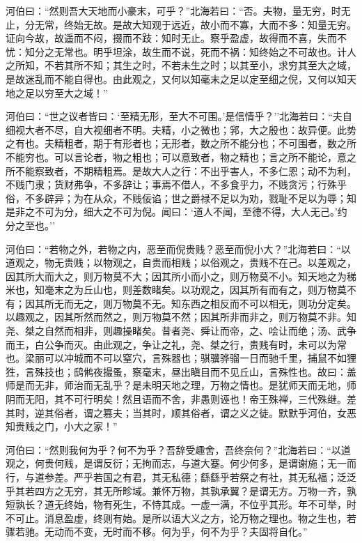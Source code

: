 \documentclass[]{article}
\begin{document}
河伯曰：``然则吾大天地而小豪末，可乎？''北海若曰：``否。夫物，量无穷，时无止，分无常，终始无故。是故大知观于远近，故小而不寡，大而不多：知量无穷。证向今故，故遥而不闷，掇而不跂：知时无止。察乎盈虚，故得而不喜，失而不忧：知分之无常也。明乎坦涂，故生而不说，死而不祸：知终始之不可故也。计人之所知，不若其所不知；其生之时，不若未生之时；以其至小，求穷其至大之域，是故迷乱而不能自得也。由此观之，又何以知毫末之足以定至细之倪，又何以知天地之足以穷至大之域！''

河伯曰：``世之议者皆曰：`至精无形，至大不可围。'是信情乎？''北海若曰：``夫自细视大者不尽，自大视细者不明。夫精，小之微也；郛，大之殷也：故异便。此势之有也。夫精粗者，期于有形者也；无形者，数之所不能分也；不可围者，数之所不能穷也。可以言论者，物之粗也；可以意致者，物之精也；言之所不能论，意之所不能察致者，不期精粗焉。是故大人之行：不出乎害人，不多仁恩；动不为利，不贱门隶；货财弗争，不多辞让；事焉不借人，不多食乎力，不贱贪污；行殊乎俗，不多辟异；为在从众，不贱佞谄；世之爵禄不足以为劝，戮耻不足以为辱；知是非之不可为分，细大之不可为倪。闻曰：`道人不闻，至德不得，大人无己。'约分之至也。''

河伯曰：``若物之外，若物之内，恶至而倪贵贱？恶至而倪小大？''北海若曰：``以道观之，物无贵贱；以物观之，自贵而相贱；以俗观之，贵贱不在己。以差观之，因其所大而大之，则万物莫不大；因其所小而小之，则万物莫不小。知天地之为稊米也，知毫末之为丘山也，则差数睹矣。以功观之，因其所有而有之，则万物莫不有；因其所无而无之，则万物莫不无。知东西之相反而不可以相无，则功分定矣。以趣观之，因其所然而然之，则万物莫不然；因其所非而非之，则万物莫不非。知尧、桀之自然而相非，则趣操睹矣。昔者尧、舜让而帝，之、哙让而绝；汤、武争而王，白公争而灭。由此观之，争让之礼，尧、桀之行，贵贱有时，未可以为常也。梁丽可以冲城而不可以窒穴，言殊器也；骐骥骅骝一日而驰千里，捕鼠不如狸狌，言殊技也；鸱鸺夜撮蚤，察毫末，昼出瞋目而不见丘山，言殊性也。故曰：盖师是而无非，师治而无乱乎？是未明天地之理，万物之情也。是犹师天而无地，师阴而无阳，其不可行明矣！然且语而不舍，非愚则诬也！帝王殊禅，三代殊继。差其时，逆其俗者，谓之篡夫；当其时，顺其俗者，谓之义之徒。默默乎河伯，女恶知贵贱之门，小大之家！''

河伯曰：``然则我何为乎？何不为乎？吾辞受趣舍，吾终奈何？''北海若曰：``以道观之，何贵何贱，是谓反衍；无拘而志，与道大蹇。何少何多，是谓谢施；无一而行，与道参差。严乎若国之有君，其无私德；繇繇乎若祭之有社，其无私福；泛泛乎其若四方之无穷，其无所畛域。兼怀万物，其孰承翼？是谓无方。万物一齐，孰短孰长？道无终始，物有死生，不恃其成。一虚一满，不位乎其形。年不可举，时不可止。消息盈虚，终则有始。是所以语大义之方，论万物之理也。物之生也，若骤若驰。无动而不变，无时而不移。何为乎，何不为乎？夫固将自化。''
\end{document}
